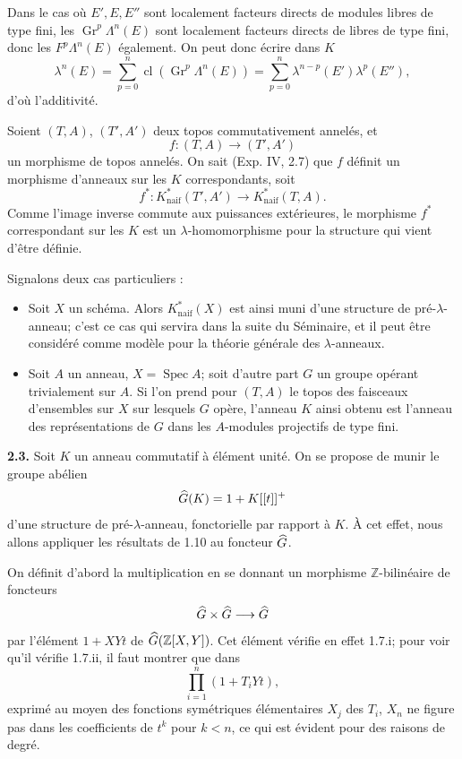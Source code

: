 \documentclass[11pt]{article}
\begin{document}
Dans le cas où \(E',E,E''\) sont localement facteurs directs de modules libres de type fini, les \(\operatorname{Gr}^p\Lambda^n(E)\) sont localement facteurs directs de libres de type fini, donc les \(F^p\Lambda^n(E)\) également. On peut donc écrire dans \(K\)
\[
  \lambda^n(E)=\sum_{p=0}^{n}\operatorname{cl}(\operatorname{Gr}^p\Lambda^n(E))
  =
  \sum_{p=0}^{n}\lambda^{n-p}(E')\lambda^p(E''),
\]
d'où l'additivité.

Soient \((T,A)\), \((T',A')\) deux topos commutativement annelés, et
\[
  f:(T,A)\longrightarrow(T',A')
\]
un morphisme de topos annelés. On sait (Exp. IV, 2.7) que \(f\) définit un morphisme d'anneaux sur les \(K\) correspondants, soit
\[
  f^*:K^*_{\mathrm{naif}}(T',A')\longrightarrow K^*_{\mathrm{naif}}(T,A).
\]
Comme l'image inverse commute aux puissances extérieures, le morphisme \(f^*\) correspondant sur les \(K\) est un \(\lambda\)-homomorphisme pour la structure qui vient d'être définie.

Signalons deux cas particuliers :
\begin{itemize}
\item Soit \(X\) un schéma. Alors \(K^*_{\mathrm{naif}}(X)\) est ainsi muni d'une structure de pré-\(\lambda\)-anneau; c'est ce cas qui servira dans la suite du Séminaire, et il peut être considéré comme modèle pour la théorie générale des \(\lambda\)-anneaux.
\item Soit \(A\) un anneau, \(X=\operatorname{Spec}A\); soit d'autre part \(G\) un groupe opérant trivialement sur \(A\). Si l'on prend pour \((T,A)\) le topos des faisceaux d'ensembles sur \(X\) sur lesquels \(G\) opère, l'anneau \(K\) ainsi obtenu est l'anneau des représentations de \(G\) dans les \(A\)-modules projectifs de type fini.
\end{itemize}

\textbf{2.3.} Soit \(K\) un anneau commutatif à élément unité. On se propose de munir le groupe abélien
\[
  \widehat G(K)=1+K[[t]]^+
\]
d'une structure de pré-\(\lambda\)-anneau, fonctorielle par rapport à \(K\). À cet effet, nous allons appliquer les résultats de 1.10 au foncteur \(\widehat G\).

On définit d'abord la multiplication en se donnant un morphisme \(\mathbb Z\)-bilinéaire de foncteurs
\[
  \widehat G\times\widehat G\longrightarrow\widehat G
\]
par l'élément \(1+XYt\) de \(\widehat G(\mathbb Z[X,Y])\). Cet élément vérifie en effet 1.7.i; pour voir qu'il vérifie 1.7.ii, il faut montrer que dans
\[
  \prod_{i=1}^{n}(1+T_iYt),
\]
exprimé au moyen des fonctions symétriques élémentaires \(X_j\) des \(T_i\), \(X_n\) ne figure pas dans les coefficients de \(t^k\) pour \(k<n\), ce qui est évident pour des raisons de degré.
\end{document}
